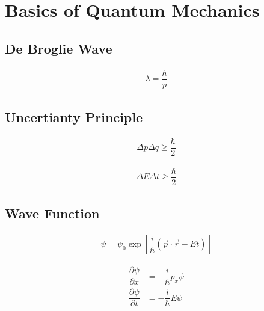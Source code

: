 
\chapter{Basics of Quantum Mechanics}

\section{De Broglie Wave}

\begin{equation*}
  \begin{aligned}
    \lambda = \dfrac{h}{p} 
  \end{aligned}
\end{equation*}

\section{Uncertianty Principle}

\begin{equation*}
  \begin{aligned}
    \Delta p \Delta q \geq \dfrac{\hbar}{2} 
  \end{aligned}
\end{equation*}

\begin{equation*}
  \begin{aligned}
    \Delta E \Delta t \geq \dfrac{\hbar}{2} 
  \end{aligned}
\end{equation*}

\section{Wave Function}

\begin{equation*}
  \begin{aligned}
    \psi = \psi_0 \exp \left[ \dfrac{i}{\hbar} \left( \vec{p} \cdot \vec{r} - E t \right)  \right]
  \end{aligned}
\end{equation*}

\begin{equation*}
  \begin{aligned}
    \dfrac{\partial \psi}{\partial x} &= - \dfrac{i}{\hbar} p_x \psi \\  
    \dfrac{\partial \psi}{\partial t} &= - \dfrac{i}{\hbar} E \psi  
  \end{aligned}
\end{equation*}



